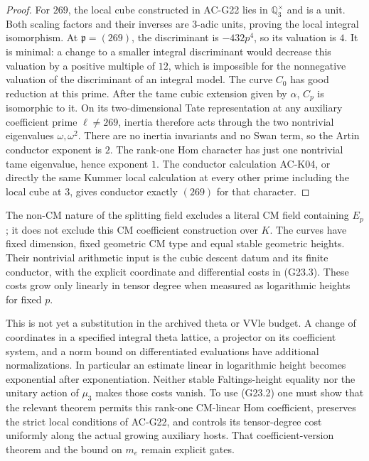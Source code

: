 \begin{proof}
For $269$, the local cube constructed in AC-G22 lies in
$\mathbb Q_3^\times$ and is a unit.  Both scaling factors and their
inverses are $3$-adic units, proving the local integral isomorphism.
At $\mathfrak p=(269)$, the discriminant is
$-432p^4$, so its valuation is $4$.  It is minimal: a
change to a smaller integral discriminant would decrease this
valuation by a positive multiple of $12$, which is impossible
for the nonnegative valuation of the discriminant of an integral
model.  The curve $C_0$ has good reduction at this prime.  After the
tame cubic extension given by $\alpha$, $C_p$ is isomorphic to it.
On its two-dimensional Tate representation at any auxiliary
coefficient prime $\ell\ne269$, inertia therefore acts
through the two nontrivial eigenvalues $\omega,\omega^2$.
There are no inertia invariants and no Swan term, so the Artin
conductor exponent is $2$.  The rank-one Hom character has just
one nontrivial tame eigenvalue, hence exponent $1$.
The conductor calculation AC-K04, or directly the same Kummer local
calculation at every other prime including the local cube at $3$,
gives conductor exactly $(269)$ for that character.
\end{proof}

\begin{remark}
The non-CM nature of the splitting field excludes a literal CM field
containing $E_p$; it does not exclude this CM coefficient
construction over $K$.  The curves have fixed dimension, fixed
geometric CM type and equal stable geometric heights.  Their
nontrivial arithmetic input is the cubic descent datum and its
finite conductor, with the explicit coordinate and differential
costs in (G23.3).  These costs grow only linearly in tensor degree
when measured as logarithmic heights for fixed $p$.

This is not yet a substitution in the archived theta or
$\mathrm{VVle}$ budget.  A change of coordinates in a specified
integral theta lattice, a projector on its coefficient system,
and a norm bound on differentiated evaluations have additional
normalizations.  In particular an estimate linear in logarithmic
height becomes exponential after exponentiation.  Neither stable
Faltings-height equality nor the unitary action of $\mu_3$ makes
those costs vanish.  To use (G23.2) one must show that the relevant
theorem permits this rank-one CM-linear Hom coefficient, preserves
the strict local conditions of AC-G22, and controls its tensor-degree
cost uniformly along the actual growing auxiliary hosts.  That
coefficient-version theorem and the bound on $m_e$ remain explicit
gates.
\end{remark}
